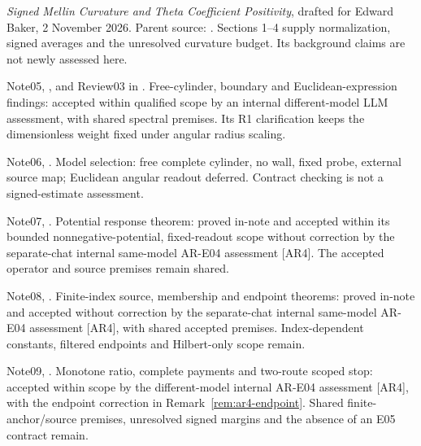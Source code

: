\documentclass[11pt,letterpaper]{article}
\numberwithin{equation}{section}
\theoremstyle{remark}
\newcommand{\evid}[1]{\textsf{[#1]}}
\begin{document}
\begin{description}[style=nextline,leftmargin=1.4cm]
\item[\evid{MC}] \emph{Signed Mellin Curvature and Theta Coefficient
Positivity}, drafted for Edward Baker, 2 November 2026.
Parent source: .
Sections 1--4 supply normalization, signed averages and the
unresolved curvature budget. Its background claims are not newly
assessed here.

\item[\evid{AR1}] Note05,
,
and Review03 in .
Free-cylinder, boundary and Euclidean-expression findings:
accepted within qualified scope by an internal different-model
LLM assessment, with shared spectral premises. Its R1 clarification
keeps the dimensionless weight fixed under angular radius scaling.

\item[\evid{C0}] Note06,
.
Model selection: free complete cylinder, no wall, fixed probe,
external source map; Euclidean angular readout deferred.
Contract checking is not a signed-estimate assessment.

\item[\evid{V}] Note07,
.
Potential response theorem: proved in-note and accepted within its
bounded nonnegative-potential, fixed-readout scope without correction
by the separate-chat internal same-model AR-E04 assessment \evid{AR4}.
The accepted operator and source premises remain shared.

\item[\evid{S}] Note08,
.
Finite-index source, membership and endpoint theorems: proved in-note
and accepted without correction by the separate-chat internal same-model
AR-E04 assessment \evid{AR4}, with shared accepted premises.
Index-dependent constants, filtered endpoints and Hilbert-only scope remain.

\item[\evid{B}] Note09,
.
Monotone ratio, complete payments and two-route scoped stop:
accepted within scope by the different-model internal AR-E04 assessment
\evid{AR4}, with the endpoint correction in
Remark~\ref{rem:ar4-endpoint}. Shared finite-anchor/source premises,
unresolved signed margins and the absence of an E05 contract remain.


\end{description}
\end{document}
